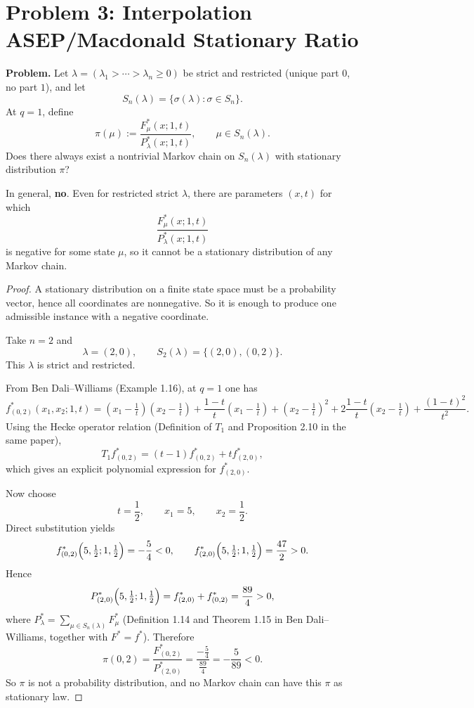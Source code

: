 \section{Problem 3: Interpolation ASEP/Macdonald Stationary Ratio}\label{sec:q3}

\textbf{Problem.}
Let $\lambda=(\lambda_1>\cdots>\lambda_n\ge 0)$ be strict and restricted (unique part $0$, no part $1$), and let
\[
S_n(\lambda)=\{\sigma(\lambda):\sigma\in S_n\}.
\]
At $q=1$, define
\[
\pi(\mu):=\frac{F^*_\mu(x;1,t)}{P^*_\lambda(x;1,t)},\qquad \mu\in S_n(\lambda).
\]
Does there always exist a nontrivial Markov chain on $S_n(\lambda)$ with stationary distribution $\pi$?

\begin{theorem}\label{thm:q3}
In general, \textbf{no}. Even for restricted strict $\lambda$, there are parameters $(x,t)$ for which
\[
\frac{F^*_\mu(x;1,t)}{P^*_\lambda(x;1,t)}
\]
is negative for some state $\mu$, so it cannot be a stationary distribution of any Markov chain.
\end{theorem}

\begin{proof}
A stationary distribution on a finite state space must be a probability vector, hence all coordinates are nonnegative.
So it is enough to produce one admissible instance with a negative coordinate.

Take $n=2$ and
\[
\lambda=(2,0),\qquad S_2(\lambda)=\{(2,0),(0,2)\}.
\]
This $\lambda$ is strict and restricted.

From Ben Dali--Williams (Example 1.16), at $q=1$ one has
\[
f^*_{(0,2)}(x_1,x_2;1,t)
=(x_1-\tfrac1t)(x_2-\tfrac1t)
+\frac{1-t}{t}(x_1-\tfrac1t)
+(x_2-\tfrac1t)^2
+2\frac{1-t}{t}(x_2-\tfrac1t)
+\frac{(1-t)^2}{t^2}.
\]
Using the Hecke operator relation (Definition of $T_1$ and Proposition 2.10 in the same paper),
\[
T_1 f^*_{(0,2)}=(t-1)f^*_{(0,2)}+t f^*_{(2,0)},
\]
which gives an explicit polynomial expression for $f^*_{(2,0)}$.

Now choose
\[
t=\frac12,\qquad x_1=5,\qquad x_2=\frac12.
\]
Direct substitution yields
\[
f^*_{(0,2)}\Bigl(5,\tfrac12;1,\tfrac12\Bigr)=-\frac54<0,
\qquad
f^*_{(2,0)}\Bigl(5,\tfrac12;1,\tfrac12\Bigr)=\frac{47}{2}>0.
\]
Hence
\[
P^*_{(2,0)}\Bigl(5,\tfrac12;1,\tfrac12\Bigr)
=f^*_{(2,0)}+f^*_{(0,2)}
=\frac{89}{4}>0,
\]
where $P^*_{\lambda}=\sum_{\mu\in S_n(\lambda)}F^*_\mu$ (Definition 1.14 and Theorem 1.15 in Ben Dali--Williams, together with $F^*=f^*$).
Therefore
\[
\pi(0,2)
=\frac{F^*_{(0,2)}}{P^*_{(2,0)}}
=\frac{-\frac54}{\frac{89}{4}}
=-\frac{5}{89}<0.
\]
So $\pi$ is not a probability distribution, and no Markov chain can have this $\pi$ as stationary law.
\end{proof}

